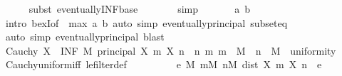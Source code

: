 \begin{isabellebody}
\ \ \ \ \isamarkupfalse%
\ {\isacharparenleft}{\kern0pt}subst\ eventually{\isacharunderscore}{\kern0pt}INF{\isacharunderscore}{\kern0pt}base{\isacharparenright}{\kern0pt}\isanewline
\ \ \ \ \isamarkupfalse%
\ \isamarkupfalse%
\ simp\isanewline
\ \ \ \ \isamarkupfalse%
\ \ a\ b\isanewline
\ \ \ \ \ \ \isamarkupfalse%
\ {\isacharparenleft}{\kern0pt}intro\ bexI{\isacharbrackleft}{\kern0pt}of\ {\isacharunderscore}{\kern0pt}\ {\isachardoublequoteopen}max\ a\ b{\isachardoublequoteclose}{\isacharbrackright}{\kern0pt}{\isacharparenright}{\kern0pt}\ {\isacharparenleft}{\kern0pt}auto\ simp{\isacharcolon}{\kern0pt}\ eventually{\isacharunderscore}{\kern0pt}principal\ subset{\isacharunderscore}{\kern0pt}eq{\isacharparenright}{\kern0pt}\isanewline
\ \ \ \ \isamarkupfalse%
\ \isamarkupfalse%
\ {\isacharparenleft}{\kern0pt}auto\ simp{\isacharcolon}{\kern0pt}\ eventually{\isacharunderscore}{\kern0pt}principal{\isacharcomma}{\kern0pt}\ blast{\isacharparenright}{\kern0pt}\isanewline
\ \ \ \ \isamarkupfalse%
\isanewline
\ \ \isamarkupfalse%
\ {\isachardoublequoteopen}Cauchy\ X\ {\isasymlongleftrightarrow}\ {\isacharparenleft}{\kern0pt}INF\ M{\isachardot}{\kern0pt}\ principal\ {\isacharbraceleft}{\kern0pt}{\isacharparenleft}{\kern0pt}X\ m{\isacharcomma}{\kern0pt}\ X\ n{\isacharparenright}{\kern0pt}\ {\isacharbar}{\kern0pt}\ n\ m{\isachardot}{\kern0pt}\ m\ {\isasymge}\ M\ {\isasymand}\ n\ {\isasymge}\ M{\isacharbraceright}{\kern0pt}{\isacharparenright}{\kern0pt}\ {\isasymle}\ uniformity{\isachardoublequoteclose}\isanewline
\ \ \ \ \isamarkupfalse%
\ Cauchy{\isacharunderscore}{\kern0pt}uniform{\isacharunderscore}{\kern0pt}iff\ le{\isacharunderscore}{\kern0pt}filter{\isacharunderscore}{\kern0pt}def\ {\isacharasterisk}{\kern0pt}\ \isacommand{{\isachardot}{\kern0pt}{\isachardot}{\kern0pt}}\isamarkupfalse%
\isanewline
\ \ \isamarkupfalse%
\ \isamarkupfalse%
\ {\isachardoublequoteopen}{\isasymdots}\ {\isacharequal}{\kern0pt}\ {\isacharparenleft}{\kern0pt}{\isasymforall}e{\isachargreater}{\kern0pt}{}{\isachardot}{\kern0pt}\ {\isasymexists}M{\isachardot}{\kern0pt}\ {\isasymforall}m{\isasymge}M{\isachardot}{\kern0pt}\ {\isasymforall}n{\isasymge}M{\isachardot}{\kern0pt}\ dist\ {\isacharparenleft}{\kern0pt}X\ m{\isacharparenright}{\kern0pt}\ {\isacharparenleft}{\kern0pt}X\ n{\isacharparenright}{\kern0pt}\ {\isacharless}{\kern0pt}\ e{\isacharparenright}{\kern0pt}{\isachardoublequoteclose}\isanewline

\end{isabellebody}
